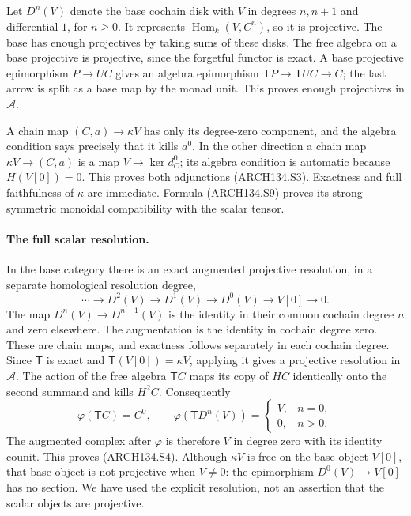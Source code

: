 Let $D^n(V)$ denote the base cochain disk with $V$ in degrees
$n,n+1$ and differential $1$, for $n\ge0$.  It represents
$\operatorname{Hom}_k(V,C^n)$, so it is projective.
The base has enough projectives by taking sums of these disks.
The free algebra on a base projective is projective, since
the forgetful functor is exact.  A base projective epimorphism
$P\to UC$ gives an algebra epimorphism
$\mathsf T P\to\mathsf T UC\to C$; the last arrow is split
as a base map by the monad unit.  This proves enough
projectives in $\mathcal A$.

A chain map $(C,a)\to\kappa V$ has only its degree-zero
component, and the algebra condition says precisely that it
kills $a^0$.  In the other direction a chain map
$\kappa V\to(C,a)$ is a map $V\to\ker d_C^0$; its algebra
condition is automatic because $H(V[0])=0$.  This proves both
adjunctions (ARCH134.S3).  Exactness and full faithfulness of
$\kappa$ are immediate.  Formula (ARCH134.S9) proves its strong
symmetric monoidal compatibility with the scalar tensor.

\paragraph{The full scalar resolution.}
In the base category there is an exact augmented projective
resolution, in a separate homological resolution degree,
\[
 \cdots\longrightarrow D^2(V)\longrightarrow D^1(V)
       \longrightarrow D^0(V)\longrightarrow V[0]
       \longrightarrow0.
 \tag{ARCH134.S10}
\]
The map $D^n(V)\to D^{n-1}(V)$ is the identity in their common
cochain degree $n$ and zero elsewhere.  The augmentation is
the identity in cochain degree zero.  These are chain maps,
and exactness follows separately in each cochain degree.
Since $\mathsf T$ is exact and
$\mathsf T(V[0])=\kappa V$, applying it gives a projective
resolution in $\mathcal A$.
The action of the free algebra $\mathsf T C$ maps its copy
of $HC$ identically onto the second summand and kills $H^2C$.
Consequently
\[
     \varphi(\mathsf T C)=C^0,\qquad
     \varphi(\mathsf T D^n(V))=
       \begin{cases}V,&n=0,\\0,&n>0.\end{cases}
 \tag{ARCH134.S11}
\]
The augmented complex after $\varphi$ is therefore $V$ in
degree zero with its identity counit.  This proves (ARCH134.S4).
Although $\kappa V$ is free on the base object $V[0]$, that
base object is not projective when $V\ne0$: the epimorphism
$D^0(V)\to V[0]$ has no section.  We have used the explicit
resolution, not an assertion that the scalar objects are
projective.

